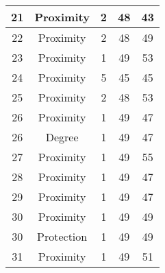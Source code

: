 \documentclass[results.tex]{subfiles}
\begin{document}
\begin{center}
\begin{tabular}{| c || c | c | c | c |}
            \hline
            21                      & Proximity                    & 2                      & 48                      & 43                   \\
            \hline
            22                      & Proximity                    & 2                      & 48                      & 49                   \\
            \hline
            23                      & Proximity                    & 1                      & 49                      & 53                   \\
            \hline
            24                      & Proximity                    & 5                      & 45                      & 45                   \\
            \hline
            25                      & Proximity                    & 2                      & 48                      & 53                   \\
            \hline
            26                      & Proximity                    & 1                      & 49                      & 47                   \\
            \hline
            26                      & Degree                       & 1                      & 49                      & 47                   \\
            \hline
            27                      & Proximity                    & 1                      & 49                      & 55                   \\
            \hline
            28                      & Proximity                    & 1                      & 49                      & 47                   \\
            \hline
            29                      & Proximity                    & 1                      & 49                      & 47                   \\
            \hline
            30                      & Proximity                    & 1                      & 49                      & 49                   \\
            \hline
            30                      & Protection                   & 1                      & 49                      & 49                   \\
            \hline
            31                      & Proximity                    & 1                      & 49                      & 51                   \\

\end{tabular}
\end{center}
\end{document}
